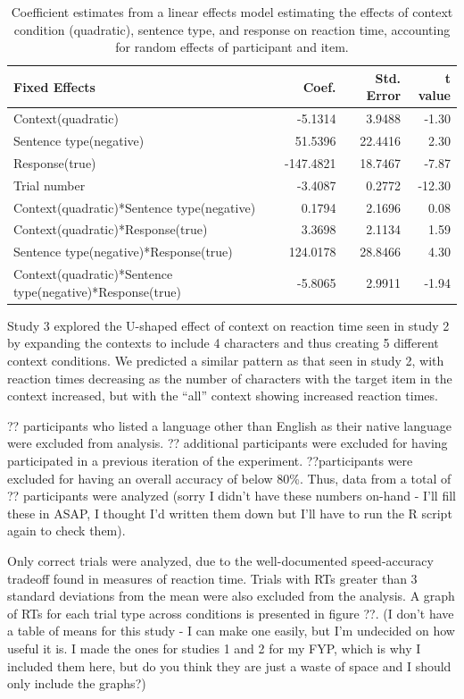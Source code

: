 \documentclass[man]{apa2}
\begin{document}
\begin{table}
\centering
\setlength{\tabcolsep}{10pt}
\begin{tabular}{ l  r  r  r  } 
\hline
  \bf{Fixed Effects} & \bf{Coef.} & \bf{Std. Error} & \bf{t value} \\ \hline \hline                       
Context(quadratic) & -5.1314   &  3.9488  & -1.30\\
\hline
Sentence type(negative) & 51.5396 &   22.4416   & 2.30\\
\hline
Response(true) & -147.4821  &  18.7467 &  -7.87\\
\hline
Trial number &-3.4087 &    0.2772 &  -12.30 \\
\hline
Context(quadratic)*Sentence type(negative)&  0.1794  &   2.1696  &  0.08\\
\hline
Context(quadratic)*Response(true) &  3.3698 &    2.1134  &  1.59 \\
\hline
Sentence type(negative)*Response(true) &124.0178 &   28.8466 &   4.30  \\
\hline
Context(quadratic)*Sentence type(negative)*Response(true) & -5.8065  &   2.9911  & -1.94\\
\hline
\hline
\end{tabular}
\caption{Coefficient estimates from a linear effects model estimating the effects of context condition (quadratic), sentence type, and response on reaction time, accounting for random effects of participant and item.}
\end{table}

Study 3 explored the U-shaped effect of context on reaction time seen in study 2 by expanding the contexts to include 4 characters and thus creating 5 different context conditions.  We predicted a similar pattern as that seen in study 2, with reaction times decreasing as the number of characters with the target item in the context increased, but with the ``all'' context showing increased reaction times.  

?? participants who listed a language other than English as their native language were excluded from analysis.  ?? additional participants were excluded for having participated in a previous iteration of the experiment.  ??participants were excluded for having an overall accuracy of below 80\%.  Thus, data from a total of ?? participants were analyzed (sorry I didn't have these numbers on-hand - I'll fill these in ASAP, I thought I'd written them down but I'll have to run the R script again to check them).  

Only correct trials were analyzed, due to the well-documented speed-accuracy tradeoff found in measures of reaction time.  Trials with RTs greater than 3 standard deviations from the mean were also excluded from the analysis. A graph of RTs for each trial type across conditions is presented in figure ??.   (I don't have a table of means for this study - I can make one easily, but I'm undecided on how useful it is.  I made the ones for studies 1 and 2 for my FYP, which is why I included them here, but do you think they are just a waste of space and I should only include the graphs?)
\end{document}
